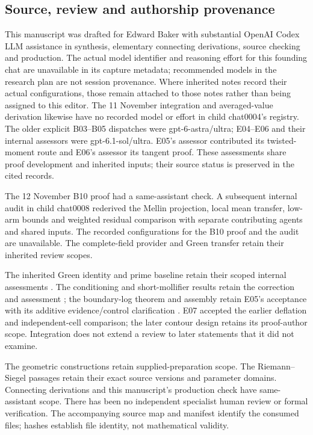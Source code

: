 \subsection{Source, review and authorship provenance}
This manuscript was drafted for Edward Baker with substantial OpenAI
Codex LLM assistance in synthesis, elementary connecting derivations,
source checking and production. The actual model identifier and reasoning
effort for this founding chat are unavailable in its capture metadata;
recommended models in the research plan are not session provenance.
Where inherited notes record their actual configurations, those remain
attached to those notes rather than being assigned to this editor.
The 11 November integration and averaged-value derivation likewise
have no recorded model or effort in child chat0004's registry. The
older explicit B03--B05 dispatches were gpt-6-astra/ultra; E04--E06
and their internal assessors were gpt-6.1-sol/ultra. E05's assessor
contributed its twisted-moment route and E06's assessor its tangent
proof. These assessments share proof development and inherited inputs;
their source status is preserved in the cited records.

The 12 November B10 proof had a same-assistant check. A subsequent
internal audit in child chat0008 rederived the Mellin projection, local
mean transfer, low-arm bounds and weighted residual comparison with
separate contributing agents and shared inputs. The recorded
configurations for the B10 proof and the audit are unavailable.
The complete-field provider and Green transfer retain their inherited
review scopes.

The inherited Green identity and prime baseline retain their scoped
internal assessments \cite{LocalizedMetricsAssessment,PrimeBaselineAssessment}.
The conditioning and short-mollifier results retain the correction and
assessment \cite{OGCorrection,OGAssessment}; the boundary-log theorem and
assembly retain E05's acceptance with its additive evidence/control
clarification \cite{OGAssemblyAssessment}. E07 accepted the earlier
deflation and independent-cell comparison; the later contour design
retains its proof-author scope. Integration does not extend a review to
later statements that it did not examine.

The geometric constructions retain supplied-preparation scope. The
Riemann--Siegel passages retain their exact source versions and parameter
domains. Connecting derivations and this manuscript's production check
have same-assistant scope. There has been no independent specialist
human review or formal verification. The accompanying source map and
manifest identify the consumed files; hashes establish file identity,
not mathematical validity.

